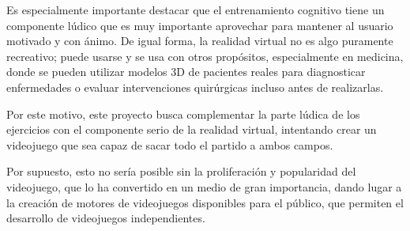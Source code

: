 Es especialmente importante destacar que el entrenamiento cognitivo tiene un componente lúdico que es muy importante aprovechar para mantener al usuario motivado y con ánimo. De igual forma, la realidad virtual no es algo puramente recreativo; puede usarse y se usa con otros propósitos, especialmente en medicina, donde se pueden utilizar modelos 3D de pacientes reales para diagnosticar enfermedades o evaluar intervenciones quirúrgicas incluso antes de realizarlas.

Por este motivo, este proyecto busca complementar la parte lúdica de los ejercicios con el componente serio de la realidad virtual, intentando crear un videojuego que sea capaz de sacar todo el partido a ambos campos.

Por supuesto, esto no sería posible sin la proliferación y popularidad del videojuego, que lo ha convertido en un medio de gran importancia, dando lugar a la creación de motores de videojuegos disponibles para el público, que permiten el desarrollo de videojuegos independientes.



\chapterend
